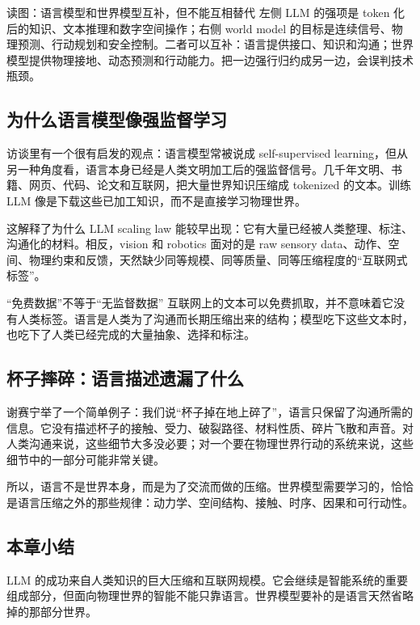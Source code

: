 \documentclass[a4paper]{article}
\begin{document}
\begin{knowledgebox}{读图：语言模型和世界模型互补，但不能互相替代}
左侧 LLM 的强项是 token 化后的知识、文本推理和数字空间操作；右侧 world model 的目标是连续信号、物理预测、行动规划和安全控制。二者可以互补：语言提供接口、知识和沟通；世界模型提供物理接地、动态预测和行动能力。把一边强行归约成另一边，会误判技术瓶颈。
\end{knowledgebox}

\subsection{为什么语言模型像强监督学习}

访谈里有一个很有启发的观点：语言模型常被说成 self-supervised learning，但从另一种角度看，语言本身已经是人类文明加工后的强监督信号。几千年文明、书籍、网页、代码、论文和互联网，把大量世界知识压缩成 tokenized 的文本。训练 LLM 像是下载这些已加工知识，而不是直接学习物理世界。

这解释了为什么 LLM scaling law 能较早出现：它有大量已经被人类整理、标注、沟通化的材料。相反，vision 和 robotics 面对的是 raw sensory data、动作、空间、物理约束和反馈，天然缺少同等规模、同等质量、同等压缩程度的“互联网式标签”。

\begin{warningbox}{“免费数据”不等于“无监督数据”}
互联网上的文本可以免费抓取，并不意味着它没有人类标签。语言是人类为了沟通而长期压缩出来的结构；模型吃下这些文本时，也吃下了人类已经完成的大量抽象、选择和标注。
\end{warningbox}

\subsection{杯子摔碎：语言描述遗漏了什么}

谢赛宁举了一个简单例子：我们说“杯子掉在地上碎了”，语言只保留了沟通所需的信息。它没有描述杯子的接触、受力、破裂路径、材料性质、碎片飞散和声音。对人类沟通来说，这些细节大多没必要；对一个要在物理世界行动的系统来说，这些细节中的一部分可能非常关键。

所以，语言不是世界本身，而是为了交流而做的压缩。世界模型需要学习的，恰恰是语言压缩之外的那些规律：动力学、空间结构、接触、时序、因果和可行动性。

\subsection{本章小结}

LLM 的成功来自人类知识的巨大压缩和互联网规模。它会继续是智能系统的重要组成部分，但面向物理世界的智能不能只靠语言。世界模型要补的是语言天然省略掉的那部分世界。
\end{document}
